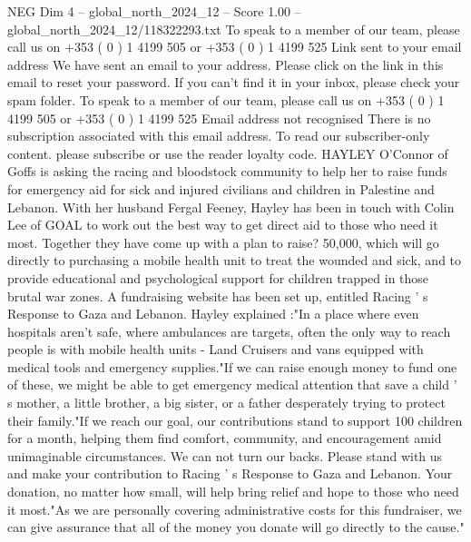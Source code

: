 \begin{textsample}{NEG Dim 4 – global\_north\_2024\_12 – Score 1.00 – global\_north\_2024\_12/118322293.txt}  \label{ex:f4_neg_133}
To speak to a member of our team, please call us on +353 ( 0 ) 1 4199 505 or +353 ( 0 ) 1 4199 525 Link sent to your email address We have sent an email to your address.
Please click on the link in this email to reset your password.
If you can't find it in your inbox, please check your spam folder.
To speak to a member of our team, please call us on +353 ( 0 ) 1 4199 505 or +353 ( 0 ) 1 4199 525 Email address not recognised There is no subscription associated with this email address.
To read our subscriber-only content. please subscribe or use the reader loyalty code.
HAYLEY O'Connor of Goffs is asking the racing and bloodstock community to help her to raise funds for emergency aid for sick and injured civilians and children in Palestine and Lebanon.
With her husband Fergal Feeney, Hayley has been in touch with Colin Lee of GOAL to work out the best way to get direct aid to those who need it most.
Together they have come up with a plan to raise? 50,000, which will go directly to purchasing a mobile health unit to treat the wounded and sick, and to provide educational and psychological support for children trapped in those brutal war zones.
A fundraising website has been set up, entitled Racing ' s Response to Gaza and Lebanon.
Hayley explained :"In a place where even hospitals aren't safe, where ambulances are targets, often the only way to reach people is with mobile health units - Land Cruisers and vans equipped with medical tools and emergency supplies."If we can raise enough money to fund one of these, we might be able to get emergency medical attention that save a child ' s mother, a little brother, a big sister, or a father desperately trying to protect their family."If we reach our goal, our contributions stand to support 100 children for a month, helping them find comfort, community, and encouragement amid unimaginable circumstances.
We can not turn our backs.
Please stand with us and make your contribution to Racing ' s Response to Gaza and Lebanon.
Your donation, no matter how small, will help bring relief and hope to those who need it most."As we are personally covering administrative costs for this fundraiser, we can give assurance that all of the money you donate will go directly to the cause."

\end{textsample}
